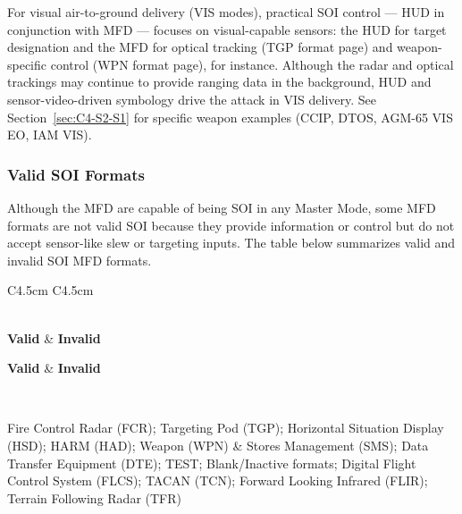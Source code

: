 \documentclass[11pt, a4paper, twoside]{report}
\begin{document}
For visual air-to-ground delivery (VIS modes), practical SOI control --- HUD in conjunction with MFD --- focuses on visual-capable sensors: the HUD for target designation and the MFD for optical tracking (TGP format page) and weapon-specific control (WPN format page), for instance. Although the radar and optical trackings may continue to provide ranging data in the background, HUD and sensor-video-driven symbology drive the attack in VIS delivery. See Section~\ref{sec:C4-S2-S1} for specific weapon examples (CCIP, DTOS, AGM-65 VIS EO, IAM VIS).

\subsubsection{Valid SOI Formats}
\label{sec:C4-S1-S1-S1}

Although the MFD are capable of being SOI in any Master Mode, some MFD formats are not valid SOI because they provide information or control but do not accept sensor-like slew or targeting inputs. The table below summarizes valid and invalid SOI MFD formats.

\begin{longtable}{C{4.5cm} C{4.5cm}}
	\caption{Valid and Invalid SOI MFD Formats \label{tab:C4-S1-MFD-format}}\\
	
	\textbf{\color{white}Valid} & \textbf{\color{white}Invalid}\\
	\endfirsthead
	
	\textbf{\color{white}Valid} & \textbf{\color{white}Invalid}\\
	\endhead
	
	\\
	\endfoot
	
	\endlastfoot
	
	Fire Control Radar (FCR); Targeting Pod (TGP); Horizontal Situation Display (HSD); HARM (HAD); Weapon (WPN) & Stores Management (SMS); Data Transfer Equipment (DTE); TEST; Blank/Inactive formats; Digital Flight Control System (FLCS); TACAN (TCN); Forward Looking Infrared (FLIR); Terrain Following Radar (TFR)
\end{longtable}

\end{document}
